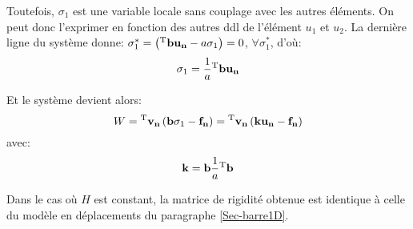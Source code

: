 Toutefois, $\sigma_1$ est une variable locale sans couplage avec les autres éléments.
On peut donc l'exprimer en fonction des autres ddl de l'élément $u_1$ et $u_2$.
La dernière ligne du système donne:
$\sigma_1^*=\left({}^\mathrm{T}\mathbf{b}\mathbf{u_n}-a\sigma_1\right)=0$, $\forall \sigma_1^*$,
d'où:
\begin{equation} \sigma_1 = \frac1a {}^\mathrm{T}\mathbf{b}\mathbf{u_n} \end{equation}

\medskip
Et le système devient alors:
\begin{equation} W={}^\mathrm{T}\mathbf{v_n}\left( \mathbf{b}\sigma_1 -\mathbf{f_n}\right) =
{}^\mathrm{T}\mathbf{v_n} \left( \mathbf{k}\mathbf{u_n}-\mathbf{f_n}\right) \end{equation}
avec:
\begin{equation} \mathbf{k}=\mathbf{b}\frac1a{}^\mathrm{T}\mathbf{b} \end{equation}

Dans le cas où $H$ est constant, la matrice de rigidité obtenue est identique à  celle
du modèle en déplacements du paragraphe \ref{Sec-barre1D}.



